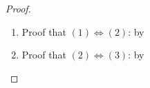 \begin{proof}
\begin{enumerate}
  \item Proof that $(1)\iff (2)$: by 


  \item Proof that $(2) \iff (3)$: by 


\end{enumerate}
\end{proof}
